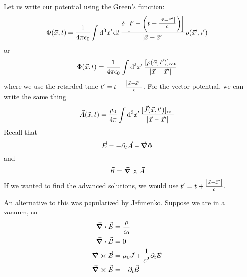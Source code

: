 \documentclass[a4paper,twoside,master.tex]{subfiles}
\begin{document}
Let us write our potential using the Green's function:
\begin{equation}
    \Phi( \vec{x},t) = \frac{1}{4 \pi \epsilon_0} \int \dd[3]{x'} \dd{t} \frac{\delta \left[ t' - \left( t - \frac{\abs{ \vec{x} - \vec{x}'}}{c} \right) \right]}{\abs{ \vec{x} - \vec{x}'}} \rho( \vec{x}', t')
\end{equation}
or
\begin{equation}
    \Phi( \vec{x}, t) = \frac{1}{4 \pi \epsilon_0} \int \dd[3]{x'} \frac{[\rho( \vec{x}, t')]_{\text{ret}}}{\abs{ \vec{x} - \vec{x}'}}
\end{equation}
where we use the retarded time $ t' = t - \frac{\abs{ \vec{x} - \vec{x}'}}{c} $. For the vector potential, we can write the same thing:
\begin{equation}
    \vec{A}( \vec{x},t) = \frac{\mu_0}{4 \pi} \int \dd[3]{x'} \frac{[ \vec{J}( \vec{x}, t')]_{\text{ret}}}{\abs{ \vec{x} - \vec{x}'}}
\end{equation}
Recall that
\begin{equation}
    \vec{E} = - \partial_t \vec{A} - \grad{\Phi}
\end{equation}
and
\begin{equation}
    \vec{B} = \curl{ \vec{A}}
\end{equation}
If we wanted to find the advanced solutions, we would use $ t' = t + \frac{\abs{ \vec{x} - \vec{x}'}}{c} $.

An alternative to this was popularized by Jefimenko. Suppose we are in a vacuum, so
\begin{align}
    \div{ \vec{E}} &= \frac{\rho}{\epsilon_0}\\
    \div{ \vec{B}} &= 0\\
    \curl{ \vec{B}} &= \mu_0 \vec{J} + \frac{1}{c^2} \partial_t \vec{E}\\
    \curl{ \vec{E}} &= - \partial_t \vec{B}
\end{align}
\end{document}
